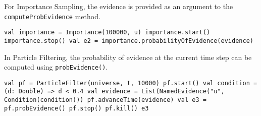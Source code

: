 
For Importance Sampling, the evidence is provided as an argument to the \texttt{computeProbEvidence} method.

\begin{flushleft}
    \texttt{val importance = Importance(100000, u)
    \newline importance.start()
    \newline importance.stop()
    \newline val e2 = importance.probabilityOfEvidence(evidence)
  }
\end{flushleft}

In Particle Filtering, the probability of evidence at the current time step can be computed using \texttt{probEvidence()}.

\begin{flushleft}
    \texttt{val pf = ParticleFilter(universe, t, 10000)
    \newline pf.start()
    \newline val condition = (d: Double) => d < 0.4
    \newline val evidence = List(NamedEvidence("u", Condition(condition)))
    \newline pf.advanceTime(evidence)
    \newline val e3 = pf.probEvidence()
    \newline pf.stop()
    \newline pf.kill()
    \newline e3
  }
\end{flushleft}

